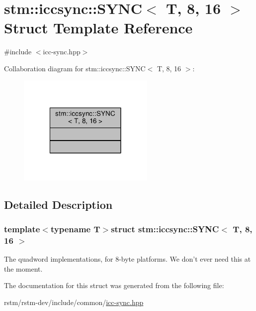 \hypertarget{structstm_1_1iccsync_1_1SYNC_3_01T_00_018_00_0116_01_4}{\section{stm\-:\-:iccsync\-:\-:S\-Y\-N\-C$<$ T, 8, 16 $>$ Struct Template Reference}
\label{structstm_1_1iccsync_1_1SYNC_3_01T_00_018_00_0116_01_4}
}


{\ttfamily \#include $<$icc-\/sync.\-hpp$>$}



Collaboration diagram for stm\-:\-:iccsync\-:\-:S\-Y\-N\-C$<$ T, 8, 16 $>$\-:
\nopagebreak
\begin{figure}[H]
\begin{center}
\leavevmode
\includegraphics[width=186pt]{structstm_1_1iccsync_1_1SYNC_3_01T_00_018_00_0116_01_4__coll__graph}
\end{center}
\end{figure}


\subsection{Detailed Description}
\subsubsection*{template$<$typename T$>$struct stm\-::iccsync\-::\-S\-Y\-N\-C$<$ T, 8, 16 $>$}

The quadword implementations, for 8-\/byte platforms. We don't ever need this at the moment. 

The documentation for this struct was generated from the following file\-:\begin{DoxyCompactItemize}
\item 
rstm/rstm-\/dev/include/common/\hyperlink{icc-sync_8hpp}{icc-\/sync.\-hpp}\end{DoxyCompactItemize}
